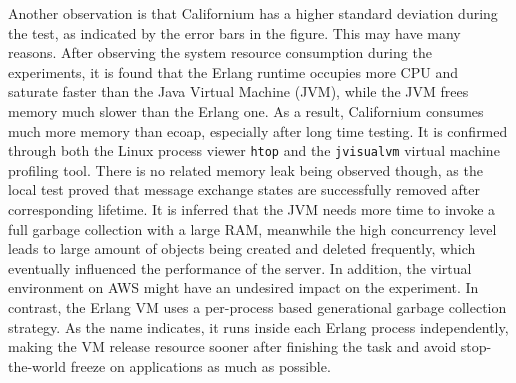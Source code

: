 Another observation is that Californium has a higher standard deviation during the test, as indicated by the error bars in the figure. This may have many reasons. After observing the system resource consumption during the experiments, it is found that the Erlang runtime occupies more CPU and saturate faster than the Java Virtual Machine (JVM), while the JVM frees memory much slower than the Erlang one. As a result, Californium consumes much more memory than ecoap, especially after long time testing. It is confirmed through both the Linux process viewer \verb|htop| and the \verb|jvisualvm| \autocite{jvisualvm} virtual machine profiling tool. There is no related memory leak being observed though, as the local test proved that message exchange states are successfully removed after corresponding lifetime. It is inferred that the JVM needs more time to invoke a full garbage collection with a large RAM, meanwhile the high concurrency level leads to large amount of objects being created and deleted frequently, which eventually influenced the performance of the server. In addition, the virtual environment on AWS might have an undesired impact on the experiment. In contrast, the Erlang VM uses a per-process based generational garbage collection strategy. As the name indicates, it runs inside each Erlang process independently, making the VM release resource sooner after finishing the task and avoid stop-the-world freeze on applications as much as possible. 

